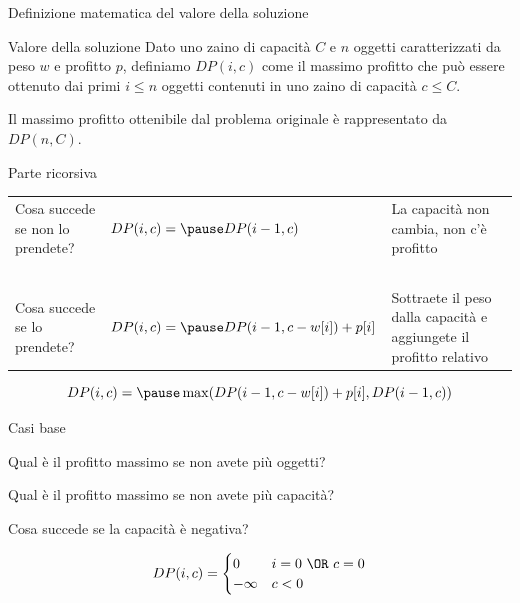 \begin{frame}{Definizione matematica del valore della soluzione}

\begin{block}{Valore della soluzione}
Dato uno zaino di capacità $C$ e $n$ oggetti caratterizzati
da peso $w$ e profitto $p$, definiamo $DP(i,c)$ come il
massimo profitto che può essere ottenuto dai primi $i \leq n$
oggetti contenuti in uno zaino di capacità $c \leq C$.
\end{block}

\bigskip
{}
Il massimo profitto ottenibile dal problema originale è rappresentato da $DP(n, C)$.

\end{frame}


\begin{frame}{Parte ricorsiva}


\bigskip
\begingroup
\renewcommand*{\arraystretch}{1.2}
\begin{tabular}{P{2.8cm}P{3.9cm}P{4.0cm}}
Cosa succede se non lo prendete? & $DP(i,c) = \pause\newline DP(i-1,c)$ & La capacità non cambia, non c'è profitto \\
~\\
Cosa succede se lo prendete? & $DP(i,c) = \pause DP(i-1,c-w[i]) + p[i]$ & Sottraete il peso dalla capacità e aggiungete il profitto relativo \\
\end{tabular}
\endgroup


\[
DP(i,c) = \pause \max( DP(i-1,c-w[i]) + p[i], DP(i-1,c) )
\]

\end{frame}


\begin{frame}{Casi base}


\pause
\BIL
\item Qual è il profitto massimo se non avete più oggetti?
\item Qual è il profitto massimo se non avete più capacità?
\item Cosa succede se la capacità è negativa?
\EIL

\pause
\[
DP(i,c) = \begin{cases}
  0 & i=0\ \OR\ c=0 \\
  -\infty & c < 0
\end{cases}
\]

\end{frame}

